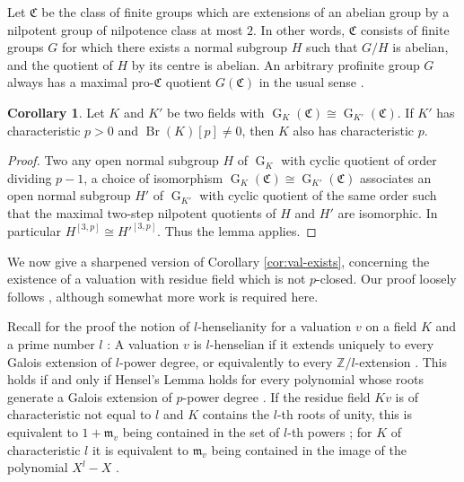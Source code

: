 \documentclass[a4paper, british, oneside]{amsart}
\newcommand{\Z}{\mathbb{Z}}
\DeclareMathOperator{\G}{G}
\DeclareMathOperator{\Br}{Br}
\theoremstyle{definition}
\newtheorem{corollary}[theorem]{Corollary}
\theoremstyle{remark}
\begin{document}
Let $\mathfrak{C}$ be the class of finite groups which are extensions of an abelian group by a nilpotent group of nilpotence class at most $2$.
In other words, $\mathfrak{C}$ consists of finite groups $G$ for which there exists a normal subgroup $H$ such that $G/H$ is abelian, and the quotient of $H$ by its centre is abelian.
An arbitrary profinite group $G$ always has a maximal pro-$\mathfrak{C}$ quotient $G(\mathfrak{C})$ in the usual sense \cite[Definition 17.3.2]{FriedJarden}.
\begin{corollary}\label{cor:char-p-sharpened}
  Let $K$ and $K'$ be two fields with $\G_K(\mathfrak{C}) \cong \G_{K'}(\mathfrak{C})$.
  If $K'$ has characteristic $p > 0$ and $\Br(K)[p] \neq 0$,
  then $K$ also has characteristic $p$.
\end{corollary}
\begin{proof}
  Two any open normal subgroup $H$ of $\G_K$ with cyclic quotient of order dividing $p-1$,
  a choice of isomorphism $\G_K(\mathfrak{C}) \cong \G_{K'}(\mathfrak{C})$ associates
  an open normal subgroup $H'$ of $\G_{K'}$ with cyclic quotient of the same order
  such that the maximal two-step nilpotent quotients of $H$ and $H'$ are isomorphic.
  In particular $H^{[3,p]} \cong H'^{[3,p]}$.
  Thus the lemma applies.
\end{proof}

We now give a sharpened version of Corollary \ref{cor:val-exists},
concerning the existence of a valuation with residue field which is not $p$-closed.
Our proof loosely follows \cite[Proposition 2.3]{EfratFesenko},
although somewhat more work is required here.

Recall for the proof the notion of $l$-henselianity for a valuation $v$ on a field $K$
and a prime number $l$ \cite[§4.2]{EnglerPrestel}:
A valuation $v$ is $l$-henselian if it extends uniquely to every Galois extension of
$l$-power degree, or equivalently to every $\Z/l$-extension \cite[Theorem 4.2.2]{EnglerPrestel}.
This holds if and only if Hensel's Lemma holds for every polynomial whose roots
generate a Galois extension of $p$-power degree \cite[Theorem 4.2.3]{EnglerPrestel}.
If the residue field $Kv$ is of characteristic not equal to $l$ and
$K$ contains the $l$-th roots of unity,
this is equivalent to $1 + \mathfrak{m}_v$ being contained in the set of $l$-th powers \cite[Corollary 4.2.4]{EnglerPrestel};
for $K$ of characteristic $l$ it is equivalent to $\mathfrak{m}_v$ being contained in the image of the polynomial $X^l-X$ \cite{ChatzidakisPerera_pHenselianity}.
\end{document}
